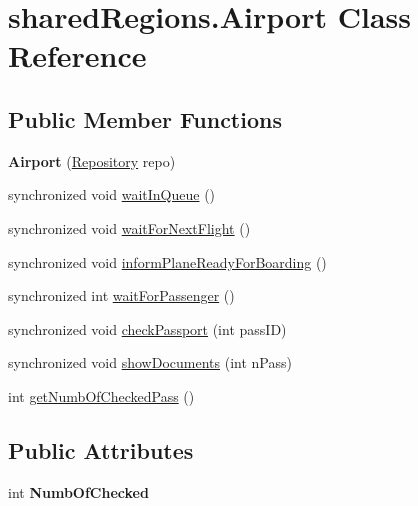 \hypertarget{classshared_regions_1_1_airport}{}\section{shared\+Regions.\+Airport Class Reference}
\label{classshared_regions_1_1_airport}
\subsection*{Public Member Functions}
\begin{DoxyCompactItemize}
\item 
\mbox{\label{classshared_regions_1_1_airport_ab97f458db451c5230a7d596b147034b2}} 
{\bfseries Airport} (\hyperlink{classshared_regions_1_1_repository}{Repository} repo)
\item 
synchronized void \hyperlink{classshared_regions_1_1_airport_a96f0b64b0a1a814d9f9916a688af4477}{wait\+In\+Queue} ()
\item 
synchronized void \hyperlink{classshared_regions_1_1_airport_a7ee042433a9a1633605570a11a294ea0}{wait\+For\+Next\+Flight} ()
\item 
synchronized void \hyperlink{classshared_regions_1_1_airport_a07a8dabf9bd3f1d90ef4b9f8fa26d732}{inform\+Plane\+Ready\+For\+Boarding} ()
\item 
synchronized int \hyperlink{classshared_regions_1_1_airport_af0a8b9670f4f72400f35a790990d96d2}{wait\+For\+Passenger} ()
\item 
synchronized void \hyperlink{classshared_regions_1_1_airport_a1dba750b542f28455a143973bbc877a0}{check\+Passport} (int pass\+ID)
\item 
synchronized void \hyperlink{classshared_regions_1_1_airport_a1a232f9b0f1311fd95665de744d871c8}{show\+Documents} (int n\+Pass)
\item 
int \hyperlink{classshared_regions_1_1_airport_a7b6204177fb19b848d01c57048bc2c69}{get\+Numb\+Of\+Checked\+Pass} ()
\end{DoxyCompactItemize}
\subsection*{Public Attributes}
\begin{DoxyCompactItemize}
\item 
\mbox{\label{classshared_regions_1_1_airport_a98b658940575f64bf637e5986c100d83}} 
int {\bfseries Numb\+Of\+Checked}
\end{DoxyCompactItemize}


